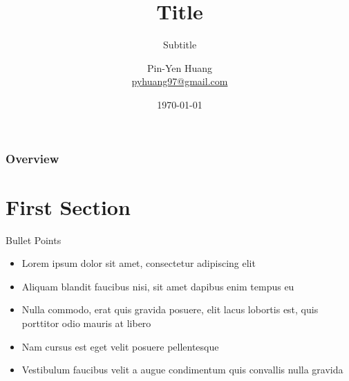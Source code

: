 \documentclass[aspectratio=169,xcolor=dvipsnames]{beamer}
\title[short title]{\LARGE{Title}} %
\subtitle{Subtitle}
\author[Pin-Yen] {
    \LARGE {Pin-Yen Huang} \\
    \medskip
    \footnotesize{\href{mailto:pyhuang97@gmail.com}{pyhuang97@gmail.com}} %
    \vspace{-1ex}
}
\institute[NTU] %
{
    Department of Computer Science and Information Engineering \\ 
    National Taiwan University %
    \vskip 3pt
}
\date{\today} %
\begin{document}
\begin{frame}
    \titlepage %
\end{frame}

\begin{frame}
    \frametitle{Overview} %
    \tableofcontents %
\end{frame}



\section{First Section}

\begin{frame}{Bullet Points}
    \begin{itemize}
        \item Lorem ipsum dolor sit amet, consectetur adipiscing elit
        \item Aliquam blandit faucibus nisi, sit amet dapibus enim tempus eu
        \item Nulla commodo, erat quis gravida posuere, elit lacus lobortis est, quis porttitor odio mauris at libero
        \item Nam cursus est eget velit posuere pellentesque
        \item Vestibulum faucibus velit a augue condimentum quis convallis nulla gravida
    \end{itemize}
\end{frame}

\end{document}
